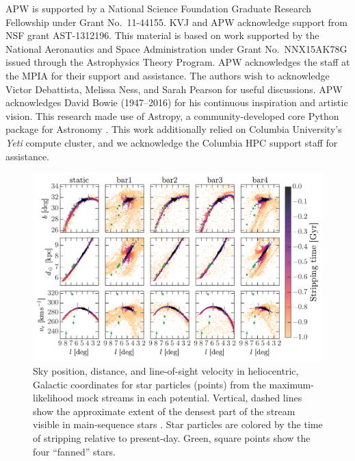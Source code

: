 \documentclass[letterpaper,12pt,preprint]{aastex}
\renewcommand{\changes}[1]{#1}
\begin{document}
\acknowledgements
APW is supported by a National Science Foundation Graduate Research Fellowship under Grant No.\ 11-44155.
KVJ and APW acknowledge support from NSF grant AST-1312196.
This material is based on work supported by the National Aeronautics and Space Administration under Grant No.\, NNX15AK78G issued through the Astrophysics Theory Program.
APW acknowledges the staff at the MPIA for their support and assistance.
The authors wish to acknowledge Victor Debattista, Melissa Ness, and Sarah Pearson for useful discussions.
APW acknowledges David Bowie (1947--2016) for his continuous inspiration and artistic vision.
This research made use of Astropy, a community-developed core Python package for Astronomy \citep{astropy13}.
This work additionally relied on Columbia University's \emph{Yeti} compute cluster, and we acknowledge the Columbia HPC support staff for assistance. \\

\begin{landscape}
\begin{figure}[p]
\begin{center}
\includegraphics[width=1.2\textwidth]{figures/mockstream0}
\caption{ Sky position, distance, and line-of-sight velocity in heliocentric, Galactic coordinates for star particles (points) from the maximum-likelihood mock streams in each potential. Vertical, dashed lines show the approximate extent of the densest part of the stream visible in main-sequence stars \citep[the segment originally detected in ][]{bernard14}. \changes{Star particles are colored by the time of stripping relative to present-day. Green, square points show the four ``fanned'' stars.}}
\label{fig:mockstream0}
\end{center}
\end{figure}
\end{landscape}
\end{document}
